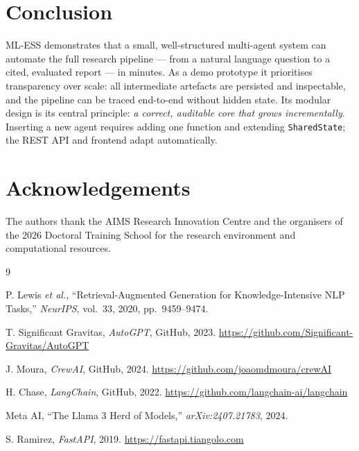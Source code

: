 \documentclass[10pt, twocolumn]{article}
\begin{document}
\section{Conclusion}

ML-ESS demonstrates that a small, well-structured multi-agent system can
automate the full research pipeline — from a natural language question to a
cited, evaluated report — in minutes. As a demo prototype it prioritises
transparency over scale: all intermediate artefacts are persisted and
inspectable, and the pipeline can be traced end-to-end without hidden state.
Its modular design is its central principle: \emph{a correct, auditable core
that grows incrementally}. Inserting a new agent requires adding one function
and extending \texttt{SharedState}; the REST API and frontend adapt
automatically.

\section*{Acknowledgements}
The authors thank the AIMS Research Innovation Centre and the organisers of the
2026 Doctoral Training School for the research environment and computational
resources.

\begin{thebibliography}{9}

P. Lewis \textit{et al.}, ``Retrieval-Augmented Generation for
Knowledge-Intensive NLP Tasks,'' \textit{NeurIPS}, vol.~33, 2020,
pp.~9459--9474.

T. Significant Gravitas, \textit{AutoGPT}, GitHub, 2023.
\url{https://github.com/Significant-Gravitas/AutoGPT}

J. Moura, \textit{CrewAI}, GitHub, 2024.
\url{https://github.com/joaomdmoura/crewAI}

H. Chase, \textit{LangChain}, GitHub, 2022.
\url{https://github.com/langchain-ai/langchain}

Meta AI, ``The Llama 3 Herd of Models,'' \textit{arXiv:2407.21783}, 2024.

S. Ramirez, \textit{FastAPI}, 2019. \url{https://fastapi.tiangolo.com}

\end{thebibliography}
\end{document}
